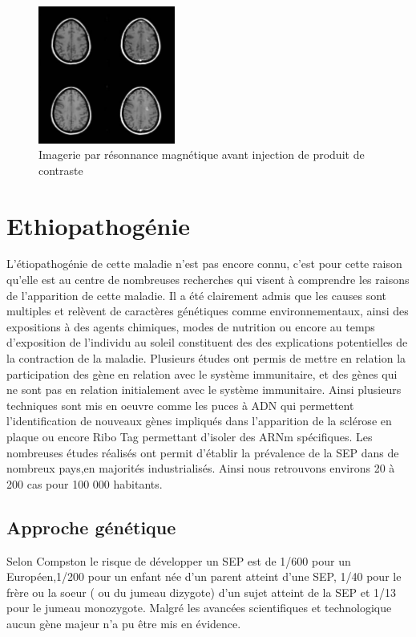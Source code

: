 \documentclass{comjnl}
\begin{document}
 \begin{figure}[h!]
\includegraphics[width=0.4\textwidth]{irm1.png}
\caption{Imagerie par résonnance magnétique avant injection de produit de contraste}
\end{figure}

\section{Ethiopathogénie}
L’étiopathogénie de cette maladie n’est pas encore connu, c’est pour cette raison qu’elle est au centre de nombreuses recherches qui visent à comprendre les raisons de l’apparition de cette maladie.
Il a été clairement admis que les causes sont multiples et relèvent de caractères génétiques comme environnementaux, ainsi des expositions à des agents chimiques, modes de nutrition ou encore au temps d’exposition de l’individu au soleil constituent des des explications potentielles de la contraction de la maladie.
Plusieurs études ont permis de mettre en relation la participation des gène en relation avec le système immunitaire, et des gènes qui ne sont pas en relation initialement avec le système immunitaire.
Ainsi plusieurs techniques sont mis en oeuvre comme les puces à ADN qui permettent l’identification de nouveaux gènes impliqués dans l’apparition de la sclérose en plaque ou encore Ribo Tag  permettant d’isoler des ARNm spécifiques.
Les nombreuses études réalisés ont permit d'établir la prévalence de la SEP dans de nombreux pays,en majorités industrialisés. Ainsi nous retrouvons environs 20 à 200 cas pour 100 000 habitants.
\subsection{Approche génétique}
Selon Compston \cite{Compston2005}  le risque de développer un SEP est de 1/600 pour un Européen,1/200 pour un enfant née d'un parent atteint d'une SEP, 1/40 pour le frère ou la soeur ( ou du jumeau dizygote) d'un sujet atteint de la SEP et 1/13 pour le jumeau monozygote.
Malgré les avancées scientifiques et technologique aucun gène majeur n'a pu être mis en évidence.
\end{document}
